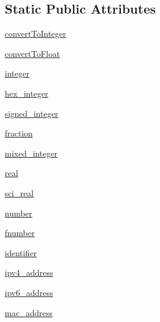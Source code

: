 \subsection*{Static Public Attributes}
\begin{DoxyCompactItemize}
\item 
\hyperlink{classpip_1_1__vendor_1_1pyparsing_1_1pyparsing__common_a9886b6fe6e73f19b350c7afb8bbb2be8}{convert\+To\+Integer}
\item 
\hyperlink{classpip_1_1__vendor_1_1pyparsing_1_1pyparsing__common_afd082fa6758510baa724a12cb8a3d00a}{convert\+To\+Float}
\item 
\hyperlink{classpip_1_1__vendor_1_1pyparsing_1_1pyparsing__common_a8ede11fe457c264fa7c6aef0876b1f7f}{integer}
\item 
\hyperlink{classpip_1_1__vendor_1_1pyparsing_1_1pyparsing__common_af48e73b9c89c0120217ede1d50c71d01}{hex\+\_\+integer}
\item 
\hyperlink{classpip_1_1__vendor_1_1pyparsing_1_1pyparsing__common_ac5eb2396d0c141fa33844a24bad2162e}{signed\+\_\+integer}
\item 
\hyperlink{classpip_1_1__vendor_1_1pyparsing_1_1pyparsing__common_acbfe336f855c0752efc1953f824a9c7b}{fraction}
\item 
\hyperlink{classpip_1_1__vendor_1_1pyparsing_1_1pyparsing__common_a21e9eda35251d9ac6aff8947c6cbca12}{mixed\+\_\+integer}
\item 
\hyperlink{classpip_1_1__vendor_1_1pyparsing_1_1pyparsing__common_a02a81be163f4ff69fc5ba869f5353ef8}{real}
\item 
\hyperlink{classpip_1_1__vendor_1_1pyparsing_1_1pyparsing__common_a9683480579512073040e1a9150773242}{sci\+\_\+real}
\item 
\hyperlink{classpip_1_1__vendor_1_1pyparsing_1_1pyparsing__common_a4defb4137dfb25817eef8dc1cc2b5d32}{number}
\item 
\hyperlink{classpip_1_1__vendor_1_1pyparsing_1_1pyparsing__common_a8818a21fd4aa91eee87ff1564da962ae}{fnumber}
\item 
\hyperlink{classpip_1_1__vendor_1_1pyparsing_1_1pyparsing__common_a3133c2f4bd3335f1cd4bd93e8c1a87df}{identifier}
\item 
\hyperlink{classpip_1_1__vendor_1_1pyparsing_1_1pyparsing__common_a6cb241df0b5a0782db16beac17d5ae0b}{ipv4\+\_\+address}
\item 
\hyperlink{classpip_1_1__vendor_1_1pyparsing_1_1pyparsing__common_a84cc8fe1d0ed7e7a96ae010c5651b7d0}{ipv6\+\_\+address}
\item 
\hyperlink{classpip_1_1__vendor_1_1pyparsing_1_1pyparsing__common_a76f9e94db36e0329a3c377aeb593fa47}{mac\+\_\+address}

\end{DoxyCompactItemize}
